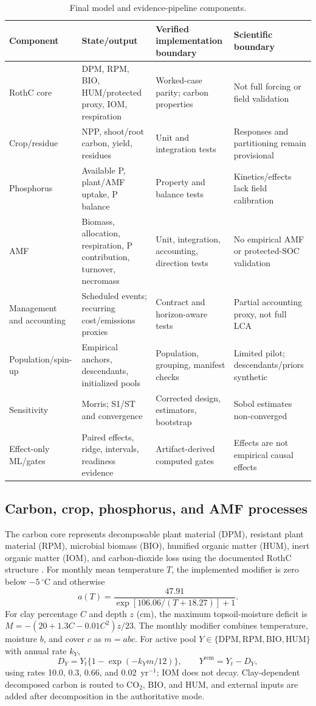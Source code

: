 \documentclass[11pt]{article}
\begin{document}
\begin{table}[H]
\centering
\caption{Final model and evidence-pipeline components.}
\label{tab:components}
\scriptsize
\begin{tabularx}{\textwidth}{P{0.14\textwidth}P{0.23\textwidth}Y Y}
\toprule
Component & State/output & Verified implementation boundary & Scientific boundary \\
\midrule
RothC core & DPM, RPM, BIO, HUM/protected proxy, IOM, respiration & Worked-case parity; carbon properties & Not full forcing or field validation \\
Crop/residue & NPP, shoot/root carbon, yield, residues & Unit and integration tests & Responses and partitioning remain provisional \\
Phosphorus & Available P, plant/AMF uptake, P balance & Property and balance tests & Kinetics/effects lack field calibration \\
AMF & Biomass, allocation, respiration, P contribution, turnover, necromass & Unit, integration, accounting, direction tests & No empirical AMF or protected-SOC validation \\
Management and accounting & Scheduled events; recurring cost/emissions proxies & Contract and horizon-aware tests & Partial accounting proxy, not full LCA \\
Population/spin-up & Empirical anchors, descendants, initialized pools & Population, grouping, manifest checks & Limited pilot; descendants/priors synthetic \\
Sensitivity & Morris; S1/ST and convergence & Corrected design, estimators, bootstrap & Sobol estimates non-converged \\
Effect-only ML/gates & Paired effects, ridge, intervals, readiness evidence & Artifact-derived computed gates & Effects are not empirical causal effects \\
\bottomrule
\end{tabularx}
\end{table}

\subsection{Carbon, crop, phosphorus, and AMF processes}

The carbon core represents decomposable plant material (DPM), resistant plant material (RPM), microbial biomass (BIO), humified organic matter (HUM), inert organic matter (IOM), and carbon-dioxide loss using the documented RothC structure \citep{coleman1996rothc,coleman2024pythonrothc}. For monthly mean temperature $T$, the implemented modifier is zero below $-5\,^{\circ}$C and otherwise
\[
a(T)=\frac{47.91}{\exp[106.06/(T+18.27)]+1}.
\]
For clay percentage $C$ and depth $z$ (cm), the maximum topsoil-moisture deficit is $M=-(20+1.3C-0.01C^2)z/23$. The monthly modifier combines temperature, moisture $b$, and cover $c$ as $m=abc$. For active pool $Y\in\{\mathrm{DPM,RPM,BIO,HUM}\}$ with annual rate $k_Y$,
\[
D_Y=Y_t\{1-\exp(-k_Ym/12)\},\qquad Y^{\mathrm{rem}}=Y_t-D_Y,
\]
using rates 10.0, 0.3, 0.66, and 0.02~yr$^{-1}$; IOM does not decay. Clay-dependent decomposed carbon is routed to CO$_2$, BIO, and HUM, and external inputs are added after decomposition in the authoritative mode.
\end{document}
